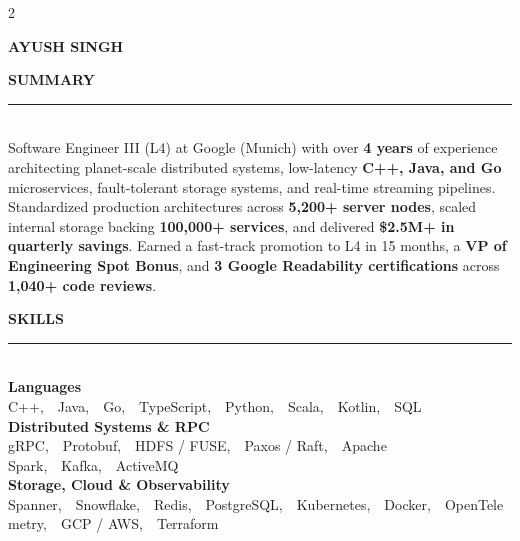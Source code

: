 \documentclass[letterpaper,10pt]{article}
\newcommand{\sidebarSection}[1]{%
  \vspace{8pt}%
  {\fontsize{10.0}{11.5}\selectfont\bfseries\color{white}\MakeUppercase{#1}}\\[-4pt]
  {\color{SidebarRule}\rule{\linewidth}{0.7pt}}\\[4pt]
}
\newcommand{\sidebarSkillGroup}[2]{%
  \vspace{3pt}%
  {\fontsize{8.5}{10.0}\selectfont\bfseries\color{white}#1}\\[2pt]
  {\fontsize{8.0}{10.5}\selectfont\color{SidebarMuted}#2}\\[3pt]
}
\newcommand{\sDot}{{\fontsize{1}{1}\selectfont\color{SidebarTeal!99!white},}\ \textperiodcentered\ }
\begin{document}

\setlength{\columnsep}{22pt}
\begin{paracol}{2}

\vspace{2pt}
{\fontsize{20.5}{23.5}\selectfont\bfseries\color{white}AYUSH SINGH}
\vspace{4pt}

\sidebarSection{SUMMARY}
{\fontsize{8.05}{10.1}\selectfont\color{SidebarMuted}
Software Engineer III (L4) at Google (Munich) with over \textbf{\color{white}4 years} of experience architecting planet-scale distributed systems, low-latency \textbf{\color{white}C++, Java, and Go} microservices, fault-tolerant storage systems, and real-time streaming pipelines. Standardized production architectures across \textbf{\color{white}5,200+ server nodes}, scaled internal storage backing \textbf{\color{white}100,000+ services}, and delivered \textbf{\color{white}\$2.5M+ in quarterly savings}. Earned a fast-track promotion to L4 in 15 months, a \textbf{\color{white}VP of Engineering Spot Bonus}, and \textbf{\color{white}3 Google Readability certifications} across \textbf{\color{white}1,040+ code reviews}.
}

\sidebarSection{SKILLS}

\sidebarSkillGroup{Languages}{%
  C++\sDot Java\sDot Go\sDot TypeScript\sDot Python\sDot Scala\sDot Kotlin\sDot SQL%
}

\sidebarSkillGroup{Distributed Systems \& RPC}{%
  gRPC\sDot Protobuf\sDot HDFS / FUSE\sDot Paxos / Raft\sDot Apache Spark\sDot Kafka\sDot ActiveMQ%
}

\sidebarSkillGroup{Storage, Cloud \& Observability}{%
  Spanner\sDot Snowflake\sDot Redis\sDot PostgreSQL\sDot Kubernetes\sDot Docker\sDot OpenTelemetry\sDot GCP / AWS\sDot Terraform%
}


\end{paracol}
\end{document}
